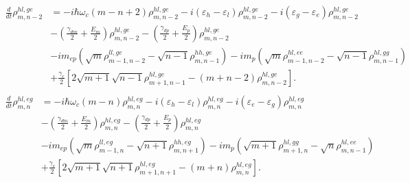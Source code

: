\documentclass[aps,prb,
superscriptaddress,
,floatfix,footinbib,longbibliography,
preprint
]{revtex4-2}
\begin{document}
%
\begin{equation}
\begin{split}
\frac{d}{dt}\rho_{m,n-2}^{hl,ge}&=-i\hbar\omega_{c}(m-n+2)\rho_{m,n-2}^{hl,ge}
-i(\varepsilon_{h}-\varepsilon_{l})\rho_{m,n-2}^{hl,ge}-i(\varepsilon_{g}-\varepsilon_{e})\rho_{m,n-2}^{hl,ge}\\
&-(\frac{\gamma_{dm}}{2}+\frac{E_{m}}{2})\rho_{m,n-2}^{hl,ge}
-(\frac{\gamma_{dp}}{2}+\frac{E_{p}}{2})\rho_{m,n-2}^{hl,ge}\\
&-im_{ep}(\sqrt{m}\rho_{m-1,n-2}^{ll,ge}-\sqrt{n-1}\rho_{m,n-1}^{hh,ge})
-im_{p}(\sqrt{m}\rho_{m-1,n-2}^{hl,ee}-\sqrt{n-1}\rho_{m,n-1}^{hl,gg})\\
&+\frac{\gamma_{c}}{2}[2\sqrt{m+1}\sqrt{n-1}\rho_{m+1,n-1}^{hl,ge}-(m+n-2)\rho_{m,n-2}^{hl,ge}].\\
\end{split}
\label{hl,ge}
\end{equation}
%
\begin{equation}
\begin{split}
\frac{d}{dt}\rho_{m,n}^{hl,eg}&=-i\hbar\omega_{c}(m-n)\rho_{m,n}^{hl,eg}-i(\varepsilon_{h}-\varepsilon_{l})\rho_{m,n}^{hl,eg}
-i(\varepsilon_{e}-\varepsilon_{g})\rho_{m,n}^{hl,eg}\\
&-(\frac{\gamma_{dm}}{2}+\frac{E_{m}}{2})\rho_{m,n}^{hl,eg}
-(\frac{\gamma_{dp}}{2}+\frac{E_{p}}{2})\rho_{m,n}^{hl,eg}\\
&-im_{ep}(\sqrt{m}\rho_{m-1,n}^{ll,eg}-\sqrt{n+1}\rho_{m,n+1}^{hh,eg})
-im_{p}(\sqrt{m+1}\rho_{m+1,n}^{hl,gg}-\sqrt{n}\rho_{m,n-1}^{hl,ee})\\
&+\frac{\gamma_{c}}{2}[2\sqrt{m+1}\sqrt{n+1}\rho_{m+1,n+1}^{hl,eg}-(m+n)\rho_{m,n}^{hl,eg}].\\
\end{split}
\label{hl,eg}
\end{equation}
%
\end{document}
